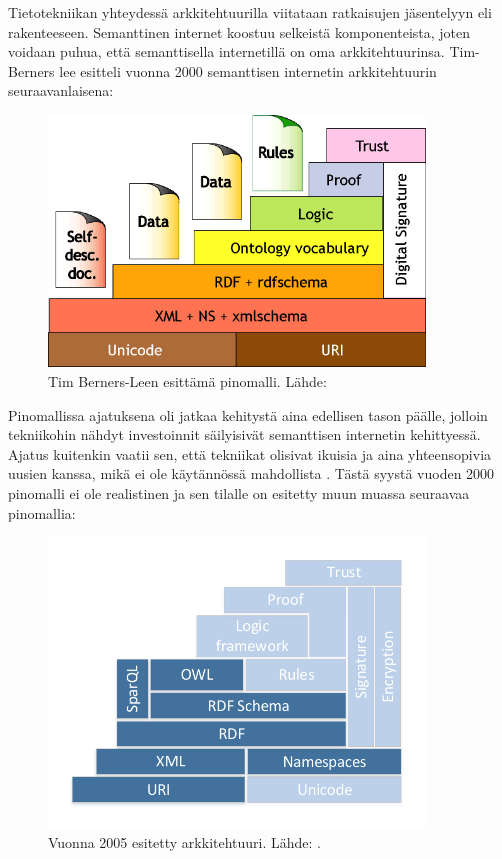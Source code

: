 \documentclass[finnish, 12pt, a4paper, elec, utf8, pdfa, online]{aaltothesis}
\begin{document}
Tietotekniikan yhteydessä arkkitehtuurilla viitataan ratkaisujen jäsentelyyn eli rakenteeseen. Semanttinen internet koostuu selkeistä komponenteista, joten voidaan puhua, että semanttisella internetillä on oma arkkitehtuurinsa. Tim-Berners lee esitteli vuonna 2000 semanttisen internetin arkkitehtuurin seuraavanlaisena:

\begin{figure}[htb]
\centering
\includegraphics[width=10cm]{images/sweb-stack.png}
\caption{Tim Berners-Leen esittämä pinomalli. Lähde: \cite{stack_bl} \label{images/sweb-stack.png}}
\end{figure}
\clearpage %

Pinomallissa ajatuksena oli jatkaa kehitystä aina edellisen tason päälle, jolloin tekniikohin nähdyt investoinnit säilyisivät semanttisen internetin kehittyessä. Ajatus kuitenkin vaatii sen, että tekniikat olisivat ikuisia ja aina yhteensopivia uusien kanssa, mikä ei ole käytännössä mahdollista \cite{stack}. Tästä syystä vuoden 2000 pinomalli ei ole realistinen ja sen tilalle on esitetty muun muassa seuraavaa pinomallia:

\begin{figure}[htb]
\centering
\includegraphics[width=10cm]{images/sweb-stack2.pdf}
\caption{Vuonna 2005 esitetty arkkitehtuuri. Lähde: \cite{stack}. \label{images/sweb-stack2.pdf}}
\end{figure}
\end{document}
